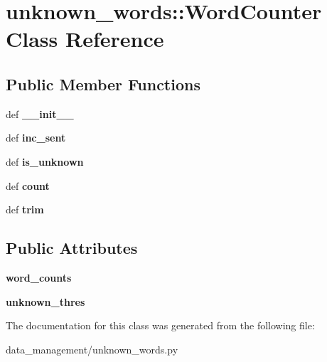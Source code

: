 \hypertarget{classunknown__words_1_1WordCounter}{
\section{unknown\_\-words::WordCounter Class Reference}
\label{classunknown__words_1_1WordCounter}
}
\subsection*{Public Member Functions}
\begin{DoxyCompactItemize}
\item 
\hypertarget{classunknown__words_1_1WordCounter_a41dc218ec5a07a5f7fecda5e0b31d185}{
def {\bfseries \_\-\_\-init\_\-\_\-}}
\label{classunknown__words_1_1WordCounter_a41dc218ec5a07a5f7fecda5e0b31d185}

\item 
\hypertarget{classunknown__words_1_1WordCounter_aacb3b61b21be83d6887ae446978605c8}{
def {\bfseries inc\_\-sent}}
\label{classunknown__words_1_1WordCounter_aacb3b61b21be83d6887ae446978605c8}

\item 
\hypertarget{classunknown__words_1_1WordCounter_a87960709afb170827f00a2250d71151d}{
def {\bfseries is\_\-unknown}}
\label{classunknown__words_1_1WordCounter_a87960709afb170827f00a2250d71151d}

\item 
\hypertarget{classunknown__words_1_1WordCounter_a191b122796650533fc7fea98304105ca}{
def {\bfseries count}}
\label{classunknown__words_1_1WordCounter_a191b122796650533fc7fea98304105ca}

\item 
\hypertarget{classunknown__words_1_1WordCounter_ae6dfc99cc0251d11fbe879f79df3a4ba}{
def {\bfseries trim}}
\label{classunknown__words_1_1WordCounter_ae6dfc99cc0251d11fbe879f79df3a4ba}

\end{DoxyCompactItemize}
\subsection*{Public Attributes}
\begin{DoxyCompactItemize}
\item 
\hypertarget{classunknown__words_1_1WordCounter_a9ad006c82610f4c491f9ea61e7a626b4}{
{\bfseries word\_\-counts}}
\label{classunknown__words_1_1WordCounter_a9ad006c82610f4c491f9ea61e7a626b4}

\item 
\hypertarget{classunknown__words_1_1WordCounter_ad77405e25b249c82c1c0ee977a6887b4}{
{\bfseries unknown\_\-thres}}
\label{classunknown__words_1_1WordCounter_ad77405e25b249c82c1c0ee977a6887b4}

\end{DoxyCompactItemize}


The documentation for this class was generated from the following file:\begin{DoxyCompactItemize}
\item 
data\_\-management/unknown\_\-words.py\end{DoxyCompactItemize}

